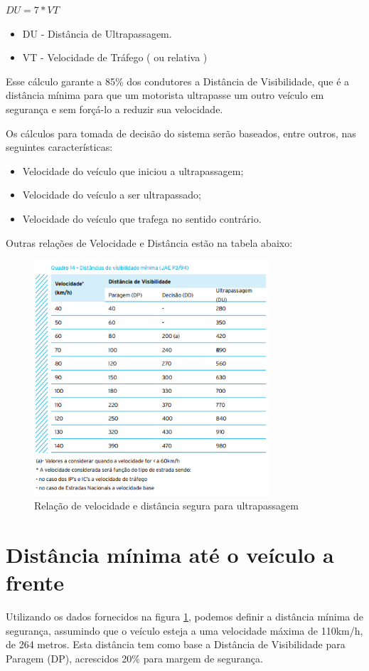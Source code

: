$DU = 7*VT$
\begin{itemize}
  \item DU - Distância de Ultrapassagem.
  \item VT - Velocidade de Tráfego ( ou relativa )
\end{itemize}

Esse cálculo garante a 85\% dos condutores a Distância de Visibilidade, que é a distância mínima para que um motorista ultrapasse um outro veículo em segurança e sem forçá-lo a reduzir sua velocidade. \cite{costa}

Os cálculos para tomada de decisão do sistema serão baseados, entre outros, nas seguintes características:

\begin{itemize}
  \item Velocidade do veículo que iniciou a ultrapassagem;
  \item Velocidade do veículo a ser ultrapassado;
  \item Velocidade do veículo que trafega no sentido contrário.
\end{itemize}

Outras relações de Velocidade e Distância estão na tabela abaixo:
\begin{figure}[h]
  \centering
  \includegraphics[width=330px, scale=0.5]{figuras/visibilidade}
  \caption{Relação de velocidade e distância segura para ultrapassagem}
  \label{fig:visibilidade}
\end{figure}

\section{Distância mínima até o veículo a frente}
Utilizando os dados fornecidos na figura \ref{fig:visibilidade}, podemos definir a distância mínima de segurança, assumindo que o veículo esteja a uma velocidade máxima de 110km/h, de 264 metros. Esta distância tem como base a Distância de Visibilidade para Paragem (DP), acrescidos 20\% para margem de segurança.

